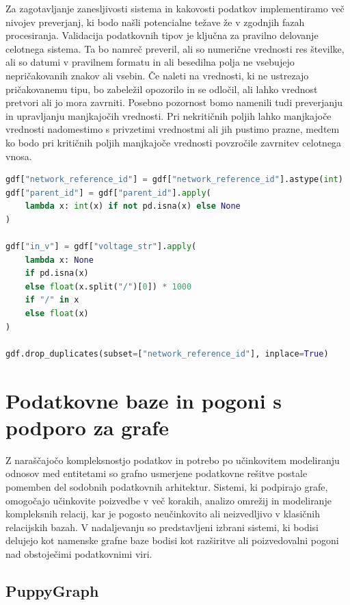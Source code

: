 \documentclass[a4paper,12pt,openright]{book}
\begin{document}
Za zagotavljanje zanesljivosti sistema in kakovosti podatkov implementiramo več nivojev preverjanj, ki bodo našli potencialne težave že v zgodnjih fazah procesiranja. Validacija podatkovnih tipov je ključna za pravilno delovanje celotnega sistema. Ta bo namreč preveril, ali so numerične vrednosti res številke, ali so datumi v pravilnem formatu in ali besedilna polja ne vsebujejo nepričakovanih znakov ali vsebin. Če naleti na vrednosti, ki ne ustrezajo pričakovanemu tipu, bo zabeležil opozorilo in se odločil, ali lahko vrednost pretvori ali jo mora zavrniti.
Posebno pozornost bomo namenili tudi preverjanju in upravljanju manjkajočih vrednosti. Pri nekritičnih poljih lahko manjkajoče vrednosti nadomestimo s privzetimi vrednostmi ali jih pustimo prazne, medtem ko bodo pri kritičnih poljih manjkajoče vrednosti povzročile zavrnitev celotnega vnosa.

\begin{lstlisting}[language=Python, caption={Čiščenje in transformacija podatkov}, captionpos=b, label={lst:data_cleaning}]
gdf["network_reference_id"] = gdf["network_reference_id"].astype(int)
gdf["parent_id"] = gdf["parent_id"].apply(
    lambda x: int(x) if not pd.isna(x) else None
)

gdf["in_v"] = gdf["voltage_str"].apply(
    lambda x: None
    if pd.isna(x)
    else float(x.split("/")[0]) * 1000
    if "/" in x
    else float(x)
)

gdf.drop_duplicates(subset=["network_reference_id"], inplace=True)
\end{lstlisting}

\section{Podatkovne baze in pogoni s podporo za grafe}

Z naraščajočo kompleksnostjo podatkov in potrebo po učinkovitem modeliranju odnosov med entitetami so grafno usmerjene podatkovne rešitve postale pomemben del sodobnih podatkovnih arhitektur. Sistemi, ki podpirajo grafe, omogočajo učinkovite poizvedbe v več korakih, analizo omrežij in modeliranje kompleksnih relacij, kar je pogosto neučinkovito ali neizvedljivo v klasičnih relacijskih bazah. V nadaljevanju so predstavljeni izbrani sistemi, ki bodisi delujejo kot namenske grafne baze bodisi kot razširitve ali poizvedovalni pogoni nad obstoječimi podatkovnimi viri.

\subsection{PuppyGraph}
\end{document}
